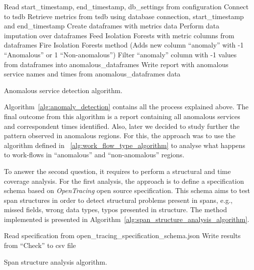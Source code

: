 \begin{algorithm}
    Read start\_timestamp, end\_timestamp, db\_settings from configuration\;
    Connect to \gls{tsdb}\;
    Retrieve metrics from \gls{tsdb} using database connection, start\_timestamp and end\_timestamp\;
    Create dataframes with metrics data\;
    Perform data imputation over dataframes\;
    Feed Isolation Forests with metric columns from dataframes\;
    Fire Isolation Forests method (Adds new column ``anomaly'' with -1 ``Anomalous'' or 1 ``Non-anomalous'')\;
    Filter ``anomaly'' column with -1 values from dataframes into anomalous\_dataframes\;
    Write report with anomalous service names and times from anomalous\_dataframes data\;
    \caption{Anomalous service detection algorithm.}
    \label{alg:anomaly_detection}
\end{algorithm}

Algorithm~\ref{alg:anomaly_detection} contains all the process explained above. The final outcome from this algorithm is a report containing all anomalous services and correspondent times identified. Also, later we decided to study further the pattern observed in anomalous regions. For this, the approach was to use the algorithm defined in ~\ref{alg:work_flow_type_algorithm} to analyse what happens to work-flows in ``anomalous'' and ``non-anomalous'' regions.

To answer the second question, it requires to perform a structural and time coverage analysis. For the first analysis, the approach is to define a specification schema based on \emph{OpenTracing} open source specification. This schema aims to test span structures in order to detect structural problems present in spans, e.g., missed fields, wrong data types, typos presented in structure. The method implemented is presented in Algorithm~\ref{alg:span_structure_analysis_algorithm}.

\begin{algorithm}
    Read specification from open\_tracing\_specification\_schema.json\;
    Write results from ``Check'' to \gls{csv} file\;
    \caption{Span structure analysis algorithm.}
    \label{alg:span_structure_analysis_algorithm}
\end{algorithm}

